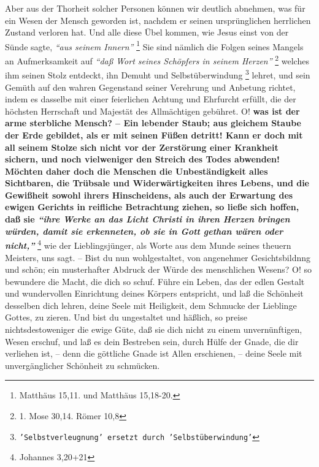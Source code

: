 Aber aus der Thorheit solcher Personen können wir deutlich abnehmen, was für ein
Wesen der Mensch geworden ist, nachdem er seinen ursprünglichen herrlichen
Zustand verloren hat. Und alle diese Übel kommen, wie Jesus einst von der
Sünde
sagte,
\textit{"`aus seinem Innern"'}
\footnote{Matthäus 15,11. und Matthäus 15,18-20.}
Sie sind nämlich
die Folgen seines Mangels an Aufmerksamkeit auf
\textit{"`daß Wort seines Schöpfers in
seinem Herzen"'}
\footnote{1. Mose 30,14. Römer 10,8}
welches ihm seinen Stolz
entdeckt, ihn Demuht und
Selbstüberwindung
\footnote{\texttt{'Selbstverleugnung' ersetzt durch 'Selbstüberwindung'}}
lehret, und sein Gemüth auf den
wahren Gegenstand seiner Verehrung und Anbetung richtet, indem es dasselbe mit
einer feierlichen Achtung und Ehrfurcht erfüllt, die der höchsten Herrschaft und
Majestät des Allmächtigen gebühret. O!  
\textbf{was ist der arme sterbliche Mensch? --
Ein lebender Staub; aus gleichem Staube der Erde gebildet, als er mit seinen
Füßen detritt! Kann er doch mit all seinem Stolze sich nicht vor der Zerstörung
einer Krankheit sichern, und noch vielweniger den Streich des Todes abwenden!
Möchten daher doch die Menschen die Unbeständigkeit alles Sichtbaren, die
Trübsale und Widerwärtigkeiten ihres Lebens, und die Gewißheit sowohl ihrers
Hinscheidens, als auch der Erwartung des ewigen Gerichts in reifliche
Betrachtung ziehen, so ließe sich hoffen, daß sie
\textit{"`ihre Werke an das Licht
Christi in ihren Herzen bringen würden, damit sie erkenneten, ob sie in Gott
gethan wären oder nicht,"'} }
\footnote{Johannes 3,20+21}
wie der Lieblingsjünger, als
Worte aus dem Munde seines theuern Meisters, uns sagt. -- Bist du nun
wohlgestaltet, von angenehmer Gesichtsbildnng und schön; ein musterhafter
Abdruck der Würde des menschlichen Wesens? O! so bewundere die Macht, die dich
so schuf. Führe ein Leben, das der edlen Gestalt und wundervollen Einrichtung
deines Körpers entspricht, und laß die Schönheit desselben dich lehren, deine
Seele mit Heiligkeit, dem Schmucke der
Lieblinge Gottes, zu zieren. Und bist du
ungestaltet und häßlich, so preise nichtsdestoweniger die ewige Güte, daß sie
dich nicht zu einem unvernünftigen, Wesen erschuf, und laß es dein Bestreben
sein, durch Hülfe der Gnade, die dir verliehen ist, --  denn die
göttliche Gnade
ist Allen erschienen, -- deine Seele mit unvergänglicher Schönheit zu schmücken.
